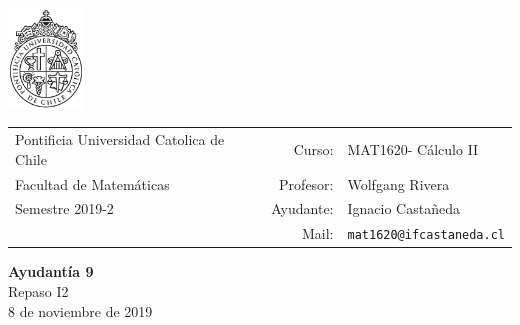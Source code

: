 \documentclass[12pt]{article}
\makeatletter
\newcommand{\ayudantia}{{\sc Ayudantía 9}}
\newcommand{\tituloayu}{Repaso I2}
\newcommand{\fecha}{8 de noviembre de 2019}
\newcommand{\sigla}{MAT1620}
\newcommand{\nombre}{Cálculo II}
\newcommand{\profesor}{Wolfgang Rivera}
\newcommand{\ano}{2019}
\newcommand{\semestre}{2}
\newcommand{\mail}{mat1620@ifcastaneda.cl}
\makeatother
\begin{document}
\thispagestyle{empty}

\begin{minipage}{2cm}
	\includegraphics[width=2cm]{../../../../img/logo.pdf}
	\vspace{0.5cm}
\end{minipage}
\begin{minipage}{\linewidth}
	\begin{tabular}{lrl}
		{\scriptsize\sc Pontificia Universidad Catolica de Chile} & \hspace*{0.7in}Curso: &
		\sigla  - \nombre\\
		{\sc Facultad de Matemáticas}&
		Profesor: & \profesor \\
		{\sc Semestre \ano-\semestre} & Ayudante: & {Ignacio Castañeda}\\
		& {Mail:} & \texttt{\mail}
	\end{tabular}
\end{minipage}

\vspace{-10mm}
\begin{center}
	{\LARGE\bf \ayudantia}\\
	\vspace{0.1cm}
	{\tituloayu}\\
	\vspace{0.1cm}
	\fecha\\
	\vspace{0.4cm}
\end{center}
\end{document}
